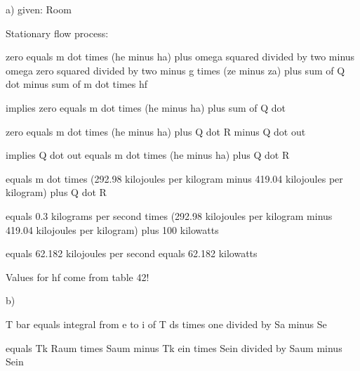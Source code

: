 a) given: Room

Stationary flow process:

zero equals m dot times (he minus ha) plus omega squared divided by two minus omega zero squared divided by two minus g times (ze minus za) plus sum of Q dot minus sum of m dot times hf

implies zero equals m dot times (he minus ha) plus sum of Q dot

zero equals m dot times (he minus ha) plus Q dot R minus Q dot out

implies Q dot out equals m dot times (he minus ha) plus Q dot R

equals m dot times (292.98 kilojoules per kilogram minus 419.04 kilojoules per kilogram) plus Q dot R

equals 0.3 kilograms per second times (292.98 kilojoules per kilogram minus 419.04 kilojoules per kilogram) plus 100 kilowatts

equals 62.182 kilojoules per second equals 62.182 kilowatts

Values for hf come from table 42!

b)

T bar equals integral from e to i of T ds times one divided by Sa minus Se

equals Tk Raum times Saum minus Tk ein times Sein divided by Saum minus Sein